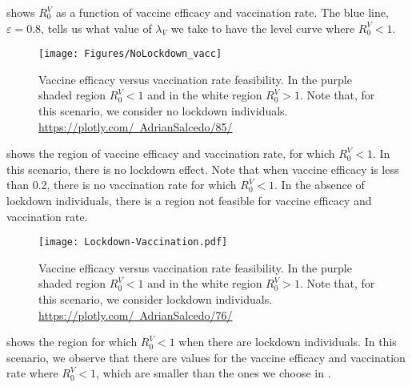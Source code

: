  shows $R_0^V$ as a function of vaccine efficacy and vaccination rate. 
The blue line, $ \varepsilon = 0.8 $, tells us what value of $ \lambda_V $ we take  to
have the level curve where $ R_0^V<1 $.

\begin{figure*}[tbh]
    \centering
      \texttt{[image: Figures/NoLockdown\_vacc]}
    \caption{
        Vaccine efficacy versus vaccination rate feasibility.
        In the purple shaded region $R_0^V<1 $ and in the white region $ R_0^V >1 $. 
        Note that, for this scenario, we consider no lockdown individuals.
    \href{https://plotly.com/~AdrianSalcedo/85/}{%
		https://plotly.com/~AdrianSalcedo/85/}
    }
    \label{fig:Nolockdown}
\end{figure*}

 shows the region of vaccine efficacy and vaccination rate, 
for which $R_0^V <1$. In this scenario, there is no lockdown effect. Note that when  vaccine
efficacy is less than 0.2, there is no vaccination rate for which $R_0^V <1$.
In the absence of lockdown individuals, there is a region not feasible for vaccine efficacy
and vaccination rate.

\begin{figure*}[tbh]
    \centering
      \texttt{[image: Lockdown-Vaccination.pdf]}
    \caption{
        Vaccine efficacy versus vaccination rate feasibility.
        In the purple shaded region $R_0^V<1 $ and in the white region $ R_0^V >1 $. 
        Note that, for this scenario, we consider lockdown individuals.
        \href{https://plotly.com/~AdrianSalcedo/76/}{%
		https://plotly.com/~AdrianSalcedo/76/}
    }
    \label{fig:Lockdown}
\end{figure*}

 shows the region for which $R_0^V <1$  when there are lockdown individuals.
In this scenario, we observe that there are values for the vaccine efficacy and vaccination
rate where $R_0^V <1$, which are smaller than the ones we choose in .
